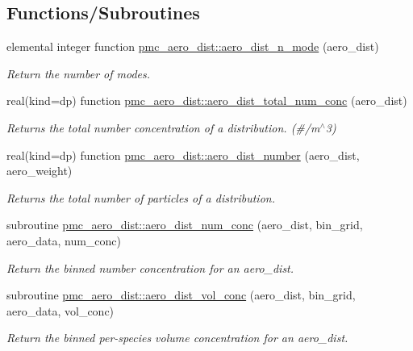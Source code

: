 \subsection*{Functions/\+Subroutines}
\begin{DoxyCompactItemize}
\item 
elemental integer function \mbox{\hyperlink{namespacepmc__aero__dist_a2a730d12e3dc3d0c51d7aff80bd30e35}{pmc\+\_\+aero\+\_\+dist\+::aero\+\_\+dist\+\_\+n\+\_\+mode}} (aero\+\_\+dist)
\begin{DoxyCompactList}\small\item\em Return the number of modes. \end{DoxyCompactList}\item 
real(kind=dp) function \mbox{\hyperlink{namespacepmc__aero__dist_a1976c9bd301379b91f6c14668315bacf}{pmc\+\_\+aero\+\_\+dist\+::aero\+\_\+dist\+\_\+total\+\_\+num\+\_\+conc}} (aero\+\_\+dist)
\begin{DoxyCompactList}\small\item\em Returns the total number concentration of a distribution. (\#/m$^\wedge$3) \end{DoxyCompactList}\item 
real(kind=dp) function \mbox{\hyperlink{namespacepmc__aero__dist_abc6bb98e0bbd18394c4c9f146d0337f0}{pmc\+\_\+aero\+\_\+dist\+::aero\+\_\+dist\+\_\+number}} (aero\+\_\+dist, aero\+\_\+weight)
\begin{DoxyCompactList}\small\item\em Returns the total number of particles of a distribution. \end{DoxyCompactList}\item 
subroutine \mbox{\hyperlink{namespacepmc__aero__dist_a59a20aa0065ae63e35a55c8079ce9d66}{pmc\+\_\+aero\+\_\+dist\+::aero\+\_\+dist\+\_\+num\+\_\+conc}} (aero\+\_\+dist, bin\+\_\+grid, aero\+\_\+data, num\+\_\+conc)
\begin{DoxyCompactList}\small\item\em Return the binned number concentration for an aero\+\_\+dist. \end{DoxyCompactList}\item 
subroutine \mbox{\hyperlink{namespacepmc__aero__dist_a876b60eece43d39ab4d5c09a5a5d22d7}{pmc\+\_\+aero\+\_\+dist\+::aero\+\_\+dist\+\_\+vol\+\_\+conc}} (aero\+\_\+dist, bin\+\_\+grid, aero\+\_\+data, vol\+\_\+conc)
\begin{DoxyCompactList}\small\item\em Return the binned per-\/species volume concentration for an aero\+\_\+dist. \end{DoxyCompactList}\item 

\end{DoxyCompactItemize}
